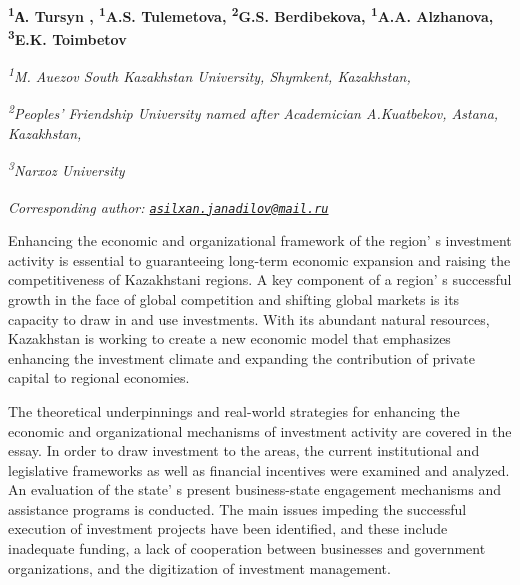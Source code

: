 
\begin{articleheader}

{\bfseries
\textsuperscript{1}А. Tursyn\textsuperscript{\envelope } \authorid,
\textsuperscript{1}A.S. Tulemetova\authorid,
\textsuperscript{2}G.S. Berdibekova\authorid,
\textsuperscript{1}A.A. Alzhanova\authorid,
\textsuperscript{3}E.K. Toimbetov\authorid}
\end{articleheader}

\begin{affiliation}
\emph{\textsuperscript{1}M. Auezov South Kazakhstan University, Shymkent, Kazakhstan,}

\emph{\textsuperscript{2}Peoples'{} Friendship University named after Academician A.Kuatbekov, Astana, Kazakhstan,}

\emph{\textsuperscript{3}Narxoz University}

\raggedright \emph{{\bfseries \textsuperscript{\envelope }}Corresponding author:
\href{mailto:asilxan.janadilov@mail.ru}{\nolinkurl{asilxan.janadilov@mail.ru}}}
\end{affiliation}

Enhancing the economic and organizational framework of the
region' s investment activity is essential to
guaranteeing long-term economic expansion and raising the
competitiveness of Kazakhstani regions. A key component of a
region' s successful growth in the face of global
competition and shifting global markets is its capacity to draw in and
use investments. With its abundant natural resources, Kazakhstan is
working to create a new economic model that emphasizes enhancing the
investment climate and expanding the contribution of private capital to
regional economies.

The theoretical underpinnings and real-world strategies for enhancing
the economic and organizational mechanisms of investment activity are
covered in the essay. In order to draw investment to the areas, the
current institutional and legislative frameworks as well as financial
incentives were examined and analyzed. An evaluation of the
state' s present business-state engagement mechanisms and
assistance programs is conducted. The main issues impeding the
successful execution of investment projects have been identified, and
these include inadequate funding, a lack of cooperation between
businesses and government \\organizations, and the digitization of
investment management.

